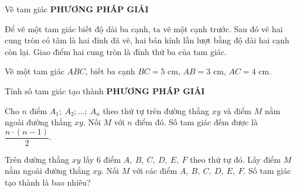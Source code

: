 \begin{dang}{Vẽ tam giác}
	\textbf{PHƯƠNG PHÁP GIẢI}\medskip
	
	Để vẽ một tam giác biết độ dài ba cạnh, ta vẽ một cạnh trước. Sau đó vẽ hai cung tròn có tâm là hai đỉnh đã vẽ, hai bán kính lần lượt bằng độ dài hai cạnh còn lại. Giao điểm hai cung tròn là đỉnh thứ ba của tam giác.
\end{dang}
\setcounter{vd}{0}
\begin{vd}%
	Vẽ một tam giác $ABC$, biết ba cạnh $BC=5$ cm, $AB=3$ cm, $AC=4$ cm.
\end{vd}\medskip

\begin{dang}{Tính số tam giác tạo thành}
	\textbf{PHƯƠNG PHÁP GIẢI}\medskip
	
	Cho $n$ điểm $A_1;\ A_2;\ldots;\ A_n$ theo thứ tự trên đường thẳng $xy$ và điểm $M$ nằm ngoài đường thẳng $xy$. Nối $M$ với $n$ điểm đó. Số tam giác đếm được là $\dfrac{n\cdot (n-1)}{2}$.
\end{dang}
\setcounter{vd}{0}
\begin{vd}%
	Trên đường thẳng $xy$ lấy $6$ điểm $A,\ B,\ C,\ D,\ E,\ F$ theo thứ tự đó. Lấy điểm $M$ nằm ngoài đường thẳng $xy$. Nối $M$ với các điểm $A,\ B,\ C,\ D,\ E,\ F$. Số tam giác tạo thành là bao nhiêu?
\end{vd}\medskip

